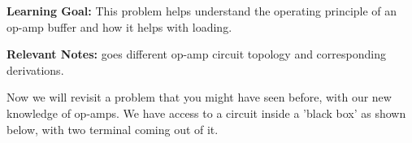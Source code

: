 

\textbf{Learning Goal:} This problem helps understand the operating principle of an op-amp buffer and how it helps with loading.

\textbf{Relevant Notes:}  goes different op-amp circuit topology and corresponding derivations.


Now we will revisit a problem that you might have seen before, with our new knowledge of op-amps. We have access to a circuit inside a 'black box' as shown below, with two terminal coming out of it.


